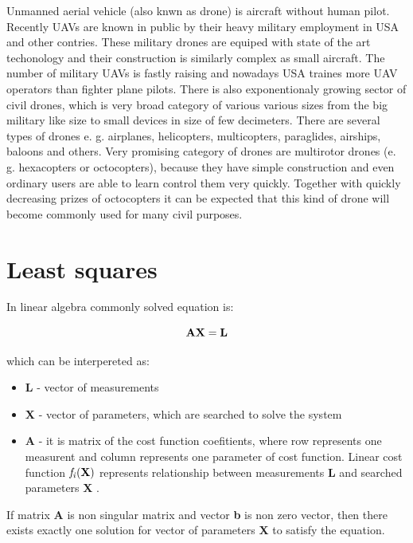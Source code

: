 \documentclass[a4paper,12pt]{report}
\newcommand{\ematr}[1]{
{\bf #1}
}
\newcommand{\evect}[1]{
{\bf #1}
}
\newcommand{\efunc}[1]{
{\it #1}
}
\begin{document}
Unmanned aerial vehicle (also knwn as drone) is aircraft without human pilot. Recently UAVs are known in public by
their heavy military employment in USA and other contries. These military drones are equiped with state of the art 
techonology and their construction is similarly complex as small aircraft.
The number of military UAVs is fastly raising and nowadays USA traines more UAV operators than fighter plane pilots. 
There is also exponentionaly growing sector of civil drones, which is very broad category of various various sizes 
from the big military like size to small devices in size of few decimeters. There are several types of drones e. g. airplanes,
helicopters, multicopters, paraglides, airships, baloons and others. 
Very promising category of drones are multirotor drones (e. g. hexacopters or octocopters), because they have simple construction and 
even ordinary users are able to learn control them very quickly. Together with quickly decreasing prizes of octocopters it can be expected 
that this kind of drone will become commonly used for many civil purposes. 

\section{Least squares}
\label{sec:least}


In linear algebra commonly solved equation is:

\begin{equation}
\label{eq:linear_eq}
\ematr{A}\evect{X} = \evect{L} 
\end{equation} 

which can be interpereted as:
\begin{itemize}
\item \evect{L} - vector of measurements
\item \evect{X} - vector of parameters, which are searched to solve the system
\item \ematr{A} - it is matrix of the cost function  coefitients,  where row represents one measurent 
		  and column represents one parameter of cost function. Linear cost function $\efunc{f_{i}(\evect{X})}$
		  represents relationship between measurements \evect{L} and searched parameters \evect{X}. 
\end{itemize}



If matrix \ematr{A} is 
non singular matrix and vector \evect{b} is non zero vector, then there exists exactly one solution 
for vector of parameters  \evect{X} to satisfy the equation. 
\end{document}
